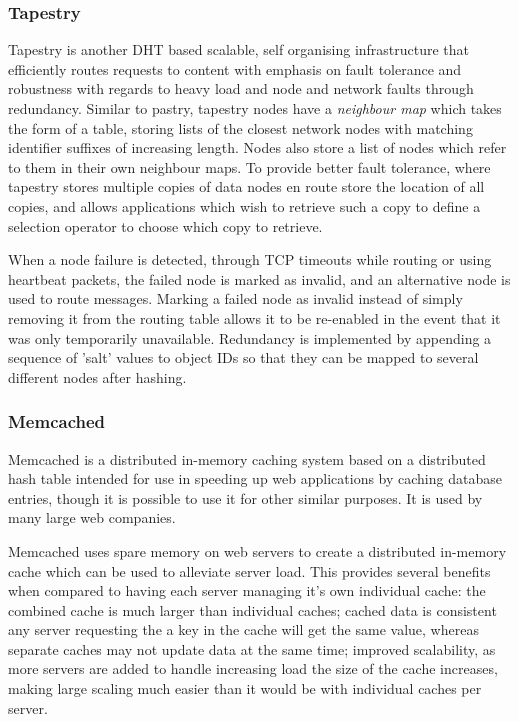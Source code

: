 \documentclass{article}
\begin{document}
\subsubsection{Tapestry}
Tapestry \cite{tapestry} is another DHT based scalable, self organising infrastructure that efficiently routes requests to content with emphasis on fault tolerance and robustness with regards to heavy load and node and network faults through redundancy.
Similar to pastry, tapestry nodes have a \textit{neighbour map} which takes the form of a table, storing lists of the closest network nodes with matching identifier suffixes of increasing length. Nodes also store a list of nodes which refer to them in their own neighbour maps.
To provide better fault tolerance, where tapestry stores multiple copies of data nodes en route store the location of all copies, and allows applications which wish to retrieve such a copy to define a selection operator to choose which copy to retrieve.

When a node failure is detected, through TCP timeouts while routing or using heartbeat packets, the failed node is marked as invalid, and an alternative node is used to route messages. Marking a failed node as invalid instead of simply removing it from the routing table allows it to be re-enabled in the event that it was only temporarily unavailable.
Redundancy is implemented by appending a sequence of 'salt' values to object IDs so that they can be mapped to several different nodes after hashing.

\subsubsection{Memcached} 
Memcached\cite{memcached} is a distributed in-memory caching system based on a distributed hash table intended for use in speeding up web applications by caching database entries, though it is possible to use it for other similar purposes. It is used by many large web companies.

Memcached uses spare memory on web servers to create a distributed in-memory cache which can be used to alleviate server load. This provides several benefits when compared to having each server managing it's own individual cache: the combined cache is much larger than individual caches; cached data is consistent any server requesting the a key in the cache will get the same value, whereas separate caches may not update data at the same time; improved scalability, as more servers are added to handle increasing load the size of the cache increases, making large scaling much easier than it would be with individual caches per server.
\end{document}
